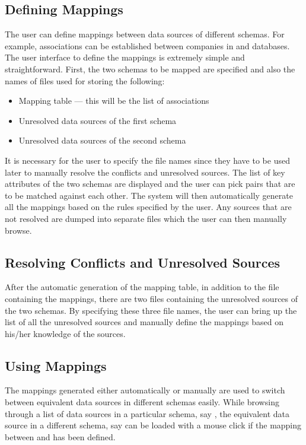 \subsection{Defining Mappings}

The user can define mappings between data sources of different
schemas.  For example, associations can be established between
companies in  and  databases. The user
interface to define the mappings is extremely simple and
straightforward. First, the two schemas to be mapped are specified and
also the names of files used for storing the following:

\begin{itemize}
\item Mapping table --- this will be the list of associations
\item Unresolved data sources of the first schema 
\item Unresolved data sources of the second schema
\end{itemize}

It is necessary for the user to specify the file names since they have
to be used later to manually resolve the conflicts and unresolved
sources. The list of key attributes of the two schemas are displayed
and the user can pick pairs that are to be matched against each other.
The system will then automatically generate all the mappings based on
the rules specified by the user.  Any sources that are not resolved
are dumped into separate files which the user can then manually
browse.

\subsection{Resolving Conflicts and Unresolved Sources}

After the automatic generation of the mapping table, in addition to
the file containing the mappings, there are two files containing the
unresolved sources of the two schemas. By specifying these three file
names, the user can bring up the list of all the unresolved sources
and manually define the mappings based on his/her knowledge of the
sources.

\subsection{Using Mappings}

The mappings generated either automatically or manually are used to
switch between equivalent data sources in different schemas
easily. While browsing through a list of data sources in a particular
schema, say , the equivalent data source in a different
schema, say  can be loaded with a mouse click if the
mapping between  and  has been defined.

